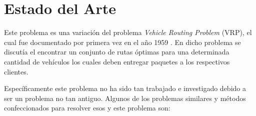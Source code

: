\section{Estado del Arte}

Este problema es una variación del problema \textit{Vehicle Routing Problem} (VRP), el cual fue documentado por primera vez en el año 1959 \cite{TruckDispatchingProblem}. En dicho problema se discutía el encontrar un conjunto de rutas óptimas para una determinada cantidad de vehículos los cuales deben entregar paquetes a los respectivos clientes.

Específicamente este problema no ha sido tan trabajado e investigado debido a ser un problema no tan antiguo. Algunos de los problemas similares y métodos confeccionados para resolver esos y este problema son:

